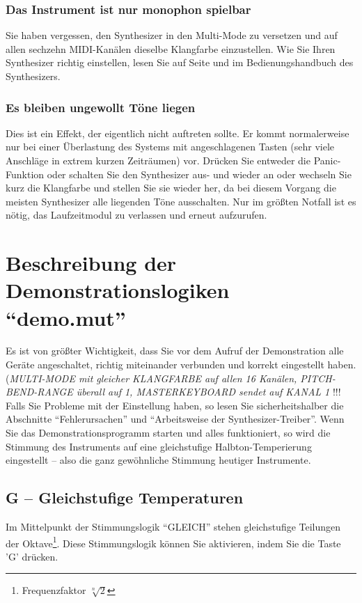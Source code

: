 \subsection{Das Instrument ist nur monophon spielbar}\label{sec:das-instrument-ist}

Sie haben vergessen, den Synthesizer in den Multi-Mode zu versetzen und 
auf allen sechzehn MIDI-Kanälen dieselbe Klangfarbe einzustellen. Wie Sie 
Ihren Synthesizer richtig einstellen, lesen Sie auf Seite 
\pageref{EINSTELLUNG} und im Bedienungshandbuch des Synthesizers.

\subsection{Es bleiben ungewollt Töne liegen}\label{sec:es-bleiben-ungewollt}

Dies ist ein Effekt, der eigentlich nicht auftreten sollte. Er kommt
normalerweise nur bei einer Überlastung des Systems mit angeschlagenen
Tasten (sehr viele Anschläge in extrem kurzen Zeiträumen) vor. Drücken
Sie entweder die Panic-Funktion oder schalten Sie den Synthesizer aus-
und wieder an oder wechseln Sie kurz die Klangfarbe und stellen Sie
sie wieder her, da bei diesem Vorgang die meisten Synthesizer alle
liegenden Töne ausschalten. Nur im größten Notfall ist es nötig, das
Laufzeitmodul zu verlassen und erneut aufzurufen.

\chapter{Beschreibung der Demonstrationslogiken "`demo.mut"'}\label{cha:beschr-der-demonstr}

Es ist von größter Wichtigkeit, dass Sie vor dem Aufruf der
Demonstration alle Geräte angeschaltet, richtig miteinander verbunden
und korrekt eingestellt haben. (\emph{MULTI-MODE mit gleicher
  KLANGFARBE auf allen 16 Kanälen, PITCH-BEND-RANGE überall auf 1,
  MASTERKEYBOARD sendet auf KANAL 1} \/ !!! Falls Sie Probleme mit der
Einstellung haben, so lesen Sie sicherheitshalber die Abschnitte
"`Fehlerursachen"' und "`Arbeitsweise der Synthesizer-Treiber"'. Wenn
Sie das Demonstrationsprogramm starten und alles funktioniert, so wird
die Stimmung des Instruments auf eine gleichstufige
Halbton-Temperierung eingestellt -- also die ganz gewöhnliche Stimmung
heutiger Instrumente.

\section{G -- Gleichstufige Temperaturen}\label{sec:g-gleichst-temp}
Im Mittelpunkt der Stimmungslogik "`GLEICH"' stehen
gleichstufige Teilungen der Oktave\footnote{Frequenzfaktor $\sqrt[n]{2}$}. 
Diese Stimmungslogik können Sie aktivieren, indem Sie die 
Taste 'G' drücken. 

